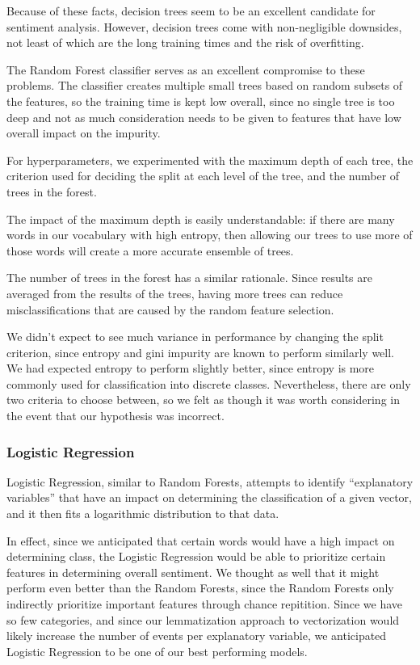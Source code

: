 \documentclass[conference]{IEEEtran}
\begin{document}
Because of these facts, decision trees seem to be an excellent candidate for sentiment analysis. However, decision trees come with non-negligible downsides, not least of which are the long training times and the risk of overfitting.

The Random Forest classifier serves as an excellent compromise to these problems. The classifier creates multiple small trees based on random subsets of the features, so the training time is kept low overall, since no single tree is too deep and not as much consideration needs to be given to features that have low overall impact on the impurity.

For hyperparameters, we experimented with the maximum depth of each tree, the criterion used for deciding the split at each level of the tree, and the number of trees in the forest.

The impact of the maximum depth is easily understandable: if there are many words in our vocabulary with high entropy, then allowing our trees to use more of those words will create a more accurate ensemble of trees.

The number of trees in the forest has a similar rationale. Since results are averaged from the results of the trees, having more trees can reduce misclassifications that are caused by the random feature selection.

We didn't expect to see much variance in performance by changing the split criterion, since entropy and gini impurity are known to perform similarly well. We had expected entropy to perform slightly better, since entropy is more commonly used for classification into discrete classes. Nevertheless, there are only two criteria to choose between, so we felt as though it was worth considering in the event that our hypothesis was incorrect.

\subsubsection{Logistic Regression}

Logistic Regression, similar to Random Forests, attempts to identify ``explanatory variables'' that have an impact on determining the classification of a given vector, and it then fits a logarithmic distribution to that data.

In effect, since we anticipated that certain words would have a high impact on determining class, the Logistic Regression would be able to prioritize certain features in determining overall sentiment. We thought as well that it might perform even better than the Random Forests, since the Random Forests only indirectly prioritize important features through chance repitition. Since we have so few categories, and since our lemmatization approach to vectorization would likely increase the number of events per explanatory variable, we anticipated Logistic Regression to be one of our best performing models.
\end{document}
